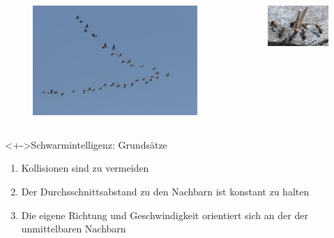 \documentclass{beamer}
\def\hilite<#1>{\temporal<#1>{\color{gray}}{\color{blue!20!red!60!black}}{\color{black}}}
\begin{document}
\begin{frame}
\begin{columns}
\begin{column}{0.25\textwidth}
\begin{figure}
				\centering
				\includegraphics[width=\textwidth]{bilder/Schwarm_Voegel.jpg}
			\end{figure}
		\end{column}
		\begin{column}{0.25\textwidth}
			\begin{figure}
				\centering
				\includegraphics[width=\textwidth]{bilder/Ameisen_jagen_Wurm.jpg}
			\end{figure}
		\end{column}
	\end{columns}
	
	
	
	\begin{block}<+->{Schwarmintelligenz: Grunds\"atze}
		\begin{enumerate}
		  \hilite<1> \item Kollisionen sind zu vermeiden
		  \hilite<2> \item Der Durchsschnittsabstand zu den Nachbarn ist konstant zu halten
		  \hilite<3> \item Die eigene Richtung und Geschwindigkeit orientiert sich an der der unmittelbaren Nachbarn
		\end{enumerate}
	\end{block}
	

\end{frame}
\end{document}
